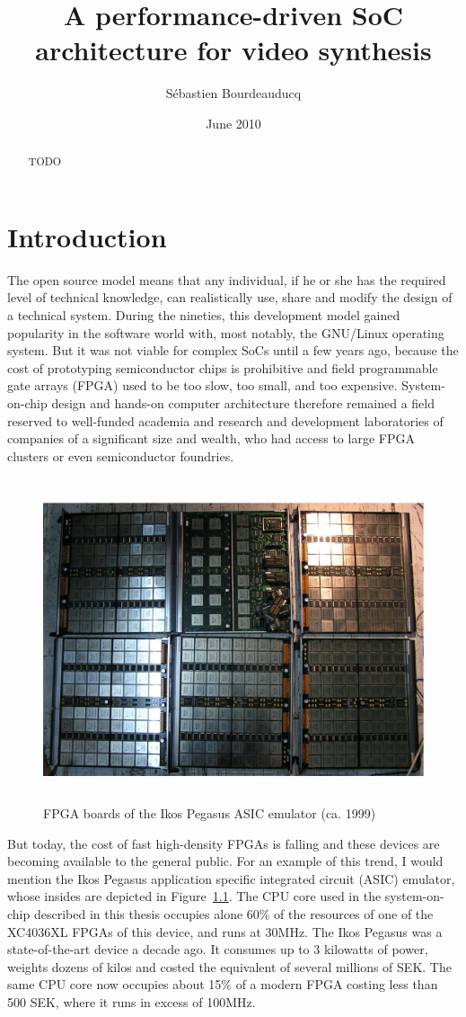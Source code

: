 \documentclass[a4paper,11pt]{kthesis}
\title{A performance-driven SoC architecture for video synthesis}
\date{June 2010}
\author{S\'ebastien Bourdeauducq}
\begin{document}
\begin{abstract}
TODO
\end{abstract}

\tableofcontents
\listoffigures

\mainmatter

\chapter{Introduction}
The open source model means that any individual, if he or she has the required level of technical knowledge, can realistically use, share and modify the design of a technical system. During the nineties, this development model gained popularity in the software world with, most notably, the GNU/Linux operating system. But it was not viable for complex SoCs until a few years ago, because the cost of prototyping semiconductor chips is prohibitive  and field programmable gate arrays (FPGA) used to be too slow, too small, and too expensive. System-on-chip design and hands-on computer architecture therefore remained a field reserved to well-funded academia and research and development laboratories of companies of a significant size and wealth, who had access to large FPGA clusters or even semiconductor foundries.

\begin{figure}[htp]
\centering
\includegraphics[height=95mm]{ikosboards.eps}
\caption{FPGA boards of the Ikos Pegasus ASIC emulator (ca. 1999)}
\label{fig:ikos}
\end{figure}

But today, the cost of fast high-density FPGAs is falling and these devices are becoming available to the general public. For an example of this trend, I would mention the Ikos Pegasus application specific integrated circuit (ASIC) emulator, whose insides are depicted in Figure~\ref{fig:ikos}. The CPU core used in the system-on-chip described in this thesis occupies alone 60\% of the resources of one of the XC4036XL FPGAs of this device, and runs at 30MHz. The Ikos Pegasus was a state-of-the-art device a decade ago. It consumes up to 3 kilowatts of power, weights dozens of kilos and costed the equivalent of several millions of SEK. The same CPU core now occupies about 15\% of a modern FPGA costing less than 500 SEK, where it runs in excess of 100MHz.
\end{document}

